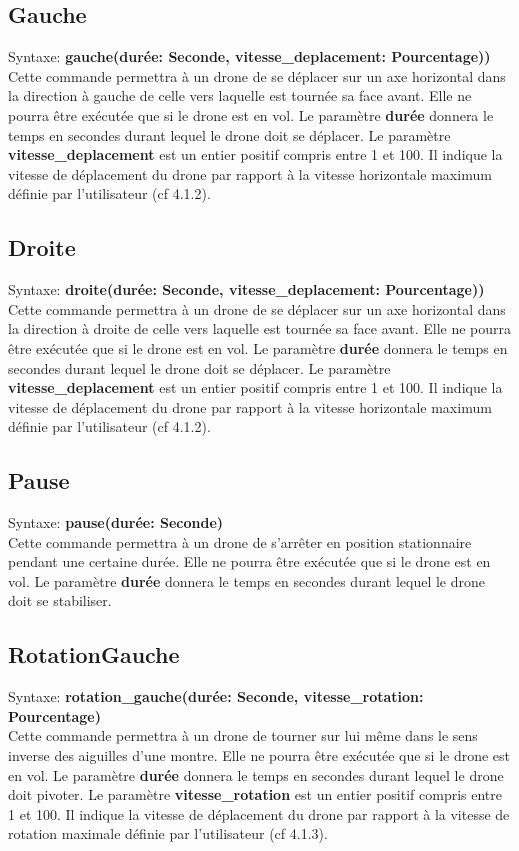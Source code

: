 \documentclass[12pt, openany]{report}
\begin{document}
\subsection{Gauche}
\quad Syntaxe: \textbf{gauche(durée: Seconde, vitesse\_deplacement: Pourcentage))} \\
Cette commande permettra à un drone de se déplacer sur un axe horizontal dans la direction à gauche de celle vers laquelle est tournée sa face avant. 
Elle ne pourra être exécutée que si le drone est en vol.
Le paramètre \textbf{durée} donnera le temps en secondes durant lequel le drone doit se déplacer.
Le paramètre \textbf{vitesse\_deplacement} est un entier positif compris entre 1 et 100. Il indique la vitesse de déplacement du drone par rapport à la vitesse horizontale maximum définie par l'utilisateur (cf 4.1.2). \\

\subsection{Droite}
\quad Syntaxe: \textbf{droite(durée: Seconde, vitesse\_deplacement: Pourcentage))} \\
Cette commande permettra à un drone de se déplacer sur un axe horizontal dans la direction à droite de celle vers laquelle est tournée sa face avant. 
Elle ne pourra être exécutée que si le drone est en vol.
Le paramètre \textbf{durée} donnera le temps en secondes durant lequel le drone doit se déplacer.
Le paramètre \textbf{vitesse\_deplacement} est un entier positif compris entre 1 et 100. Il indique la vitesse de déplacement du drone par rapport à la vitesse horizontale maximum définie par l'utilisateur (cf 4.1.2). \\

\subsection{Pause}
\quad Syntaxe: \textbf{pause(durée: Seconde)} \\
Cette commande permettra à un drone de s'arrêter en position stationnaire pendant une certaine durée. 
Elle ne pourra être exécutée que si le drone est en vol.
Le paramètre \textbf{durée} donnera le temps en secondes durant lequel le drone doit se stabiliser. \\

\subsection{RotationGauche}
\quad Syntaxe: \textbf{rotation\_gauche(durée: Seconde, vitesse\_rotation: Pourcentage)} \\
Cette commande permettra à un drone de tourner sur lui même dans le sens inverse des aiguilles d'une montre. 
Elle ne pourra être exécutée que si le drone est en vol.
Le paramètre \textbf{durée} donnera le temps en secondes durant lequel le drone doit pivoter.
Le paramètre \textbf{vitesse\_rotation} est un entier positif compris entre 1 et 100. Il indique la vitesse de déplacement du drone par rapport à la vitesse de rotation maximale définie par l'utilisateur (cf 4.1.3). \\
\end{document}
